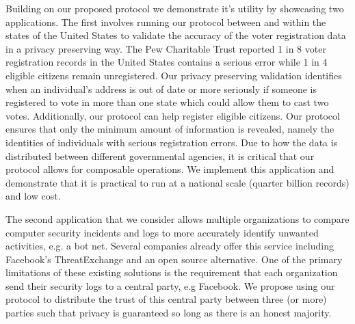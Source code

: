 Building on our proposed protocol we demonstrate it's utility by showcasing two applications. The first involves running our protocol between and within the states of the United States to validate the accuracy of the voter registration data in a privacy preserving way. The Pew Charitable Trust\cite{pew} reported 1 in 8 voter registration records in the United States contains a serious error while 1 in 4 eligible citizens remain unregistered. Our privacy preserving validation identifies when an individual's address is out of date or more seriously if someone is registered to vote in more than one state which could allow them to cast two votes. 
\iffullversion
Additionally, our protocol can help register eligible citizens. Our protocol ensures that only the minimum amount of information is revealed, namely the identities of individuals with serious registration errors.
\fi 
Due to how the data is distributed between different governmental agencies, it is critical that our protocol allows for composable operations. We implement this application and demonstrate that it is practical to run at a national scale (quarter billion records) and low cost.

The second application that we consider allows multiple organizations to compare computer security incidents and logs to more accurately identify unwanted activities, e.g. a bot net. Several companies already offer this service including Facebook's ThreatExchange\cite{threat} and an open source alternative\cite{alt_threat}. One of the primary limitations of these existing solutions is the requirement that each organization send their security logs to a central party, e.g Facebook. We propose using our protocol to distribute the trust of this central party between three (or more) parties such that privacy is guaranteed so long as there is an honest majority.



